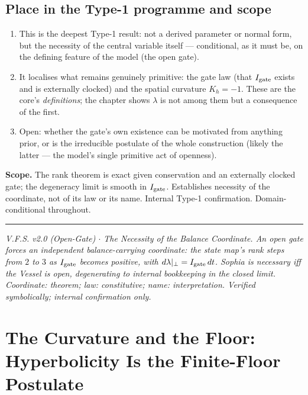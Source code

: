 \documentclass[11pt,a4paper,oneside]{book}
\newcommand{\Igate}{I_{\rm gate}}
\theoremstyle{plain}
\theoremstyle{definition}
\theoremstyle{remark}
\begin{document}
\section{Place in the Type-1 programme and scope}

\begin{enumerate}[leftmargin=1.6em,itemsep=2pt]
\item This is the deepest Type-1 result: not a derived parameter or normal form, but the necessity of
the central variable itself --- conditional, as it must be, on the defining feature of the model (the
open gate).
\item It localises what remains genuinely primitive: the gate law (that $\Igate$ exists and is
externally clocked) and the spatial curvature $K_h=-1$. These are the core's \emph{definitions}; the
chapter shows $\lambda$ is not among them but a consequence of the first.
\item Open: whether the gate's own existence can be motivated from anything prior, or is the
irreducible postulate of the whole construction (likely the latter --- the model's single primitive
act of openness).
\end{enumerate}

\textbf{Scope.} The rank theorem is exact given conservation and an externally clocked gate; the
degeneracy limit is smooth in $\Igate$. Establishes necessity of the coordinate, not of its law or its
name. Internal Type-1 confirmation. Domain-conditional throughout.

\vspace{0.5em}
\hrule
\smallskip
\noindent\footnotesize\emph{V.F.S. v2.0 (Open-Gate) $\cdot$ The Necessity of the Balance Coordinate.
An open gate forces an independent balance-carrying coordinate: the state map's rank steps from $2$ to
$3$ as $\Igate$ becomes positive, with $d\lambda|_{\perp}=\Igate\,dt$. Sophia is necessary iff the
Vessel is open, degenerating to internal bookkeeping in the closed limit. Coordinate: theorem; law:
constitutive; name: interpretation. Verified symbolically; internal confirmation only.}

\chapter{The Curvature and the Floor: Hyperbolicity Is the Finite-Floor Postulate}
\end{document}
